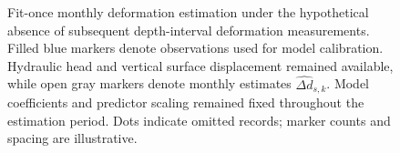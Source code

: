 \begin{figure}[htbp]
{
  }
  \caption{Fit-once monthly deformation estimation under the hypothetical absence of subsequent depth-interval deformation measurements. Filled blue markers denote observations used for model calibration. Hydraulic head and vertical surface displacement remained available, while open gray markers denote monthly estimates $\widehat{\Delta d}_{s,k}$. Model coefficients and predictor scaling remained fixed throughout the estimation period. Dots indicate omitted records; marker counts and spacing are illustrative.}
  \label{fig:no_subsequent_mlcw_design}
\end{figure}

\FloatBarrier
